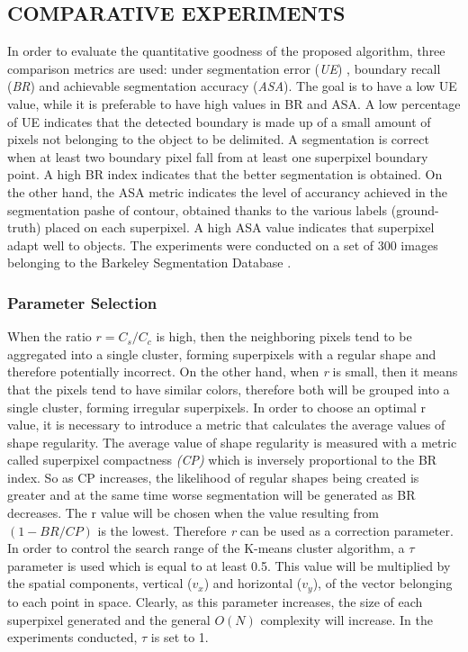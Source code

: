 \subsection{COMPARATIVE EXPERIMENTS}
In order to evaluate the quantitative goodness of the proposed algorithm, 
three comparison metrics are used: under segmentation error (\emph{UE}) \cite{0781426514}, boundary 
recall (\emph{BR}) and achievable segmentation accuracy (\emph{ASA}). The 
goal is to have a low UE value, while it is preferable to have high values in BR 
and ASA. A low percentage of UE indicates that the detected boundary is made 
up of a small amount of pixels not belonging to the object to be delimited. 
A segmentation is correct when at least two boundary pixel fall from at least 
one superpixel boundary point. A high BR index indicates that the better 
segmentation is obtained. On the other hand, the ASA metric indicates the 
level of accurancy achieved in the segmentation pashe of contour, obtained 
thanks to the various labels (ground-truth) placed on each superpixel. A 
high ASA value indicates that superpixel adapt well to objects. The experiments 
were conducted on a set of 300 images belonging to the Barkeley 
Segmentation Database \cite{0781426515}.

\subsubsection{Parameter Selection}
When the ratio $ r = C_s / C_c $ is high, then the neighboring pixels tend to be 
aggregated into a single cluster, forming superpixels with a regular shape 
and therefore potentially incorrect. On the other hand, when \emph{r} is small, 
then it means that the pixels tend to have similar colors, therefore both 
will be grouped into a single cluster, forming irregular superpixels. In order to 
choose an optimal r value, it is necessary to introduce a metric that calculates 
the average  values of shape regularity. The average value of shape regularity 
is measured with a metric called superpixel compactness \emph{(CP)} \cite{0781426533} which is 
inversely proportional to the BR index. So as CP increases, the likelihood 
of regular shapes being created is greater and at the same time worse segmentation 
will be generated as BR decreases. The r value will be chosen 
when the value resulting from $ (1-BR / CP) $ is the lowest. Therefore \emph{r} can be 
used as a correction parameter. In order to control the search range of the 
K-means cluster algorithm, a $ \tau $ parameter is used which is equal to at least 
0.5. This value will be multiplied by the spatial components, vertical ($ v_x $) 
and horizontal ($ v_y $), of the vector belonging to each point in space. Clearly, 
as this parameter increases, the size of each superpixel generated and the 
general $ O(N) $ complexity will increase. In the experiments conducted, $ \tau $ is 
set to 1.

